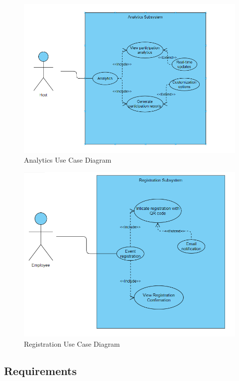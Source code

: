 \documentclass[a4paper,12pt]{article}
\begin{document}
\begin{figure}[H]
    \centering
    \includegraphics[width=\textwidth]{AnalyticsSubsystem.png}
    \caption{Analytics Use Case Diagram}
    \label{fig:use-case-diagram}
\end{figure}

\begin{figure}[H]
    \centering
    \includegraphics[width=\textwidth]{RegistrationSubsystem.png}
    \caption{Registration Use Case Diagram}
    \label{fig:use-case-diagram}
\end{figure}

\subsection{Requirements}
\end{document}
